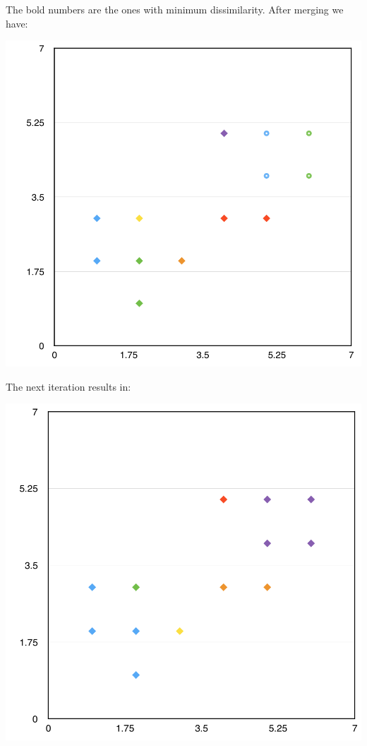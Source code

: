 \documentclass[11pt]{article}
\begin{document}
The bold numbers are the ones with minimum dissimilarity. After merging we have:
\begin{center}
\includegraphics[scale=0.57]{agnes-1.png}
\end{center}

The next iteration results in:
\begin{center}
\includegraphics[scale=0.57]{agnes-2.png}
\end{center}
\end{document}

